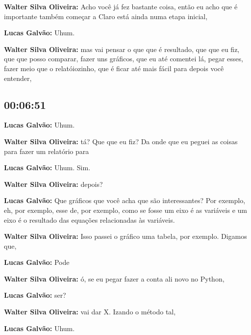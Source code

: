 \textbf{Walter Silva Oliveira:} Acho você já fez bastante coisa, então eu acho que é importante também começar a Claro está ainda numa etapa inicial,



\textbf{Lucas Galvão:} Uhum.



\textbf{Walter Silva Oliveira:} mas vai pensar o que que é resultado, que que eu fiz, que que posso comparar, fazer uns gráficos, que eu até comentei lá, pegar esses, fazer meio que o relatóiozinho, que é ficar até mais fácil para depois você entender,



\subsection{\textbf{00:06:51}}



\textbf{Lucas Galvão:} Uhum.



\textbf{Walter Silva Oliveira:} tá? Que que eu fiz? Da onde que eu peguei as coisas para fazer um relatório para



\textbf{Lucas Galvão:} Uhum. Sim.



\textbf{Walter Silva Oliveira:} depois?



\textbf{Lucas Galvão:} Que gráficos que você acha que são interessantes? Por exemplo, eh, por exemplo, esse de, por exemplo, como se fosse um eixo é as variáveis e um eixo é o resultado das equações relacionadas às variáveis.



\textbf{Walter Silva Oliveira:} Isso passei o gráfico uma tabela, por exemplo. Digamos que,



\textbf{Lucas Galvão:} Pode



\textbf{Walter Silva Oliveira:} ó, se eu pegar fazer a conta ali novo no Python,



\textbf{Lucas Galvão:} ser?



\textbf{Walter Silva Oliveira:} vai dar X. Izando o método tal,



\textbf{Lucas Galvão:} Uhum.



